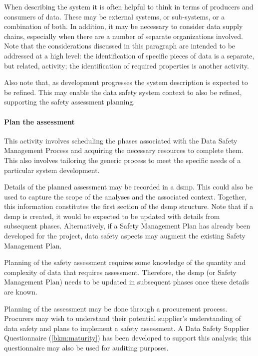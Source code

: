 When describing the system it is often helpful to think in terms of producers and consumers of data. These may be external systems, or sub-systems, or a combination of both. In addition, it may be necessary to consider data supply chains, especially when there are a number of separate organizations involved. Note that the considerations discussed in this paragraph are intended to be addressed at a high level: the identification of specific pieces of data is a separate, but related, activity; the identification of required properties is another activity.

Also note that, as development progresses the system description is expected to be refined. This may enable the data safety system context to also be refined, supporting the \gls{safety assessment} planning.

\paragraph{Plan the assessment}
This activity involves scheduling the phases associated with the Data Safety Management Process and acquiring the necessary resources to complete them. This also involves tailoring the generic process to meet the specific needs of a particular system development. 

Details of the planned assessment may be recorded in a \gls{dsmp}. This could also be used to capture the scope of the analyses and the associated context. Together, this \gls{information} constitutes the first section of the \gls{dsmp} structure. Note that if a \gls{dsmp} is created, it would be expected to be updated with details from subsequent phases. Alternatively, if a Safety Management Plan has already been developed for the project, data safety aspects may augment the existing Safety Management Plan. 

Planning of the \gls{safety assessment} requires some knowledge of the quantity and complexity of data that requires assessment. Therefore, the \gls{dsmp} (or Safety Management Plan) needs to be updated in subsequent phases once these details are known.

Planning of the assessment may be done through a procurement process. Procurers may wish to understand their potential supplier's understanding of data safety and plans to implement a \gls{safety assessment}. A Data Safety Supplier Questionnaire (\autoref{bkm:maturity}) has been developed to support this analysis; this questionnaire may also be used for auditing purposes.

